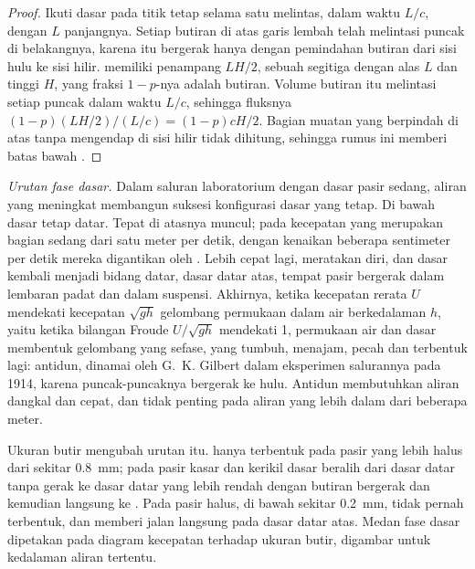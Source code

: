 \begin{proof}
Ikuti dasar pada titik tetap selama satu  melintas, dalam waktu $L/c$, dengan $L$ panjangnya. Setiap butiran  di atas garis lembah telah melintasi puncak  di belakangnya, karena  itu bergerak hanya dengan pemindahan butiran dari sisi hulu ke sisi hilir.  memiliki penampang $LH/2$, sebuah segitiga dengan alas $L$ dan tinggi $H$, yang fraksi $1 - p$-nya adalah butiran. Volume butiran itu melintasi setiap puncak dalam waktu $L/c$, sehingga fluksnya $(1-p)(LH/2)/(L/c) = (1-p)cH/2$. Bagian muatan yang berpindah di atas  tanpa mengendap di sisi hilir tidak dihitung, sehingga rumus ini memberi batas bawah .
\end{proof}

\emph{Urutan fase dasar.} Dalam saluran laboratorium dengan dasar pasir sedang, aliran yang meningkat membangun suksesi konfigurasi dasar yang tetap. Di bawah  dasar tetap datar. Tepat di atasnya  muncul; pada kecepatan yang merupakan bagian sedang dari satu meter per detik, dengan kenaikan beberapa sentimeter per detik mereka digantikan oleh . Lebih cepat lagi,  meratakan diri, dan dasar kembali menjadi bidang datar, dasar datar atas, tempat pasir bergerak dalam lembaran padat dan dalam suspensi. Akhirnya, ketika kecepatan rerata $U$ mendekati kecepatan $\sqrt{gh}$ gelombang permukaan dalam air berkedalaman $h$, yaitu ketika bilangan Froude $U/\sqrt{gh}$ mendekati 1, permukaan air dan dasar membentuk gelombang yang sefase, yang tumbuh, menajam, pecah dan terbentuk lagi: antidun, dinamai oleh G.~K. Gilbert dalam eksperimen salurannya pada 1914, karena puncak-puncaknya bergerak ke hulu. Antidun membutuhkan aliran dangkal dan cepat, dan tidak penting pada aliran yang lebih dalam dari beberapa meter.

Ukuran butir mengubah urutan itu.  hanya terbentuk pada pasir yang lebih halus dari sekitar \qty{0.8}{mm}; pada pasir kasar dan kerikil dasar beralih dari dasar datar tanpa gerak ke dasar datar yang lebih rendah dengan butiran bergerak dan kemudian langsung ke . Pada pasir halus, di bawah sekitar \qty{0.2}{mm},  tidak pernah terbentuk, dan  memberi jalan langsung pada dasar datar atas. Medan fase dasar dipetakan pada diagram kecepatan terhadap ukuran butir, digambar untuk kedalaman aliran tertentu.


